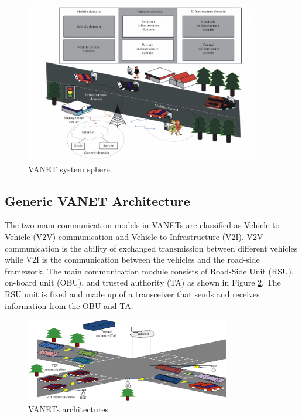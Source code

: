 \documentclass[
  oneside,
  11pt, a4paper,
  footinclude=true,
  headinclude=true,
  cleardoublepage=empty
]{scrbook}
\begin{document}
\begin{figure}[H]
\begin{center}
  \includegraphics[width=0.9\textwidth]{img/v2.png}
\end{center}
  \caption{VANET system sphere. ~\cite{vanetusarlater}}
  \centering  
\label{Vanets-Best-b}
\end{figure}




\subsection{Generic VANET Architecture}


The two main communication models in VANETs are classified as Vehicle-to-Vehicle (V2V) communication and Vehicle to Infrastructure (V2I). V2V communication is the ability of exchanged transmission between different vehicles while V2I is the communication between the vehicles and the road-side framework. The main communication module consists of Road-Side Unit (RSU), on-board unit (OBU), and trusted authority (TA) as shown in Figure \ref{VANETs architectures}. The RSU unit is fixed and made up of a transceiver that sends and receives information from the OBU and TA.


\begin{figure}[H]
\begin{center}
  \includegraphics[width=0.8\textwidth]{img/vanetarchi.png}
\end{center}
  \caption{VANETs architectures ~\cite{vanet2}}
  \centering  
\label{VANETs architectures}
\end{figure}
\end{document}
